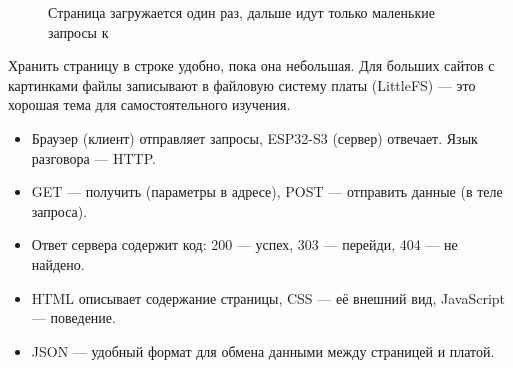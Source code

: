 \begin{figure}[H]
\centering
{}
\caption{Страница загружается один раз, дальше идут только маленькие запросы к }
\end{figure}

\begin{tip}
Хранить страницу в строке  удобно, пока она небольшая. Для больших сайтов с картинками
файлы записывают в файловую систему платы (LittleFS) --- это хорошая тема для самостоятельного изучения.
\end{tip}

\begin{summary}
\begin{itemize}[leftmargin=*]
  \item Браузер (клиент) отправляет запросы, ESP32-S3 (сервер) отвечает. Язык разговора --- HTTP.
  \item GET --- получить (параметры в адресе), POST --- отправить данные (в теле запроса).
  \item Ответ сервера содержит код: 200 --- успех, 303 --- перейди, 404 --- не найдено.
  \item HTML описывает содержание страницы, CSS --- её внешний вид, JavaScript --- поведение.
  \item JSON --- удобный формат для обмена данными между страницей и платой.
\end{itemize}
\end{summary}

